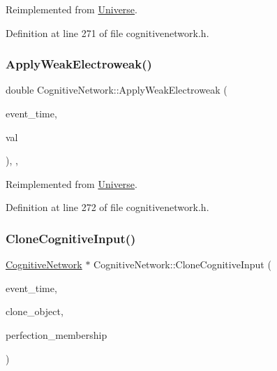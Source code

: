 Reimplemented from \hyperlink{class_universe_a6d1226b3adec3c42a833afdbb6a65a92}{Universe}.



Definition at line 271 of file cognitivenetwork.\+h.

\mbox{\label{class_cognitive_network_ab8bc213d2806f0dc49c1284bf934fc24}} 
\subsubsection{\texorpdfstring{Apply\+Weak\+Electroweak()}{ApplyWeakElectroweak()}}
{\footnotesize\ttfamily double Cognitive\+Network\+::\+Apply\+Weak\+Electroweak (\begin{DoxyParamCaption}\item[{std\+::chrono\+::time\+\_\+point$<$ \hyperlink{universe_8h_a0ef8d951d1ca5ab3cfaf7ab4c7a6fd80}{Clock} $>$}]{event\+\_\+time,  }\item[{double}]{val }\end{DoxyParamCaption})\hspace{0.3cm}{\ttfamily [inline]}, {\ttfamily [final]}, {\ttfamily [virtual]}}



Reimplemented from \hyperlink{class_universe_a46a906baabb63e5d31f8b48ea1fae52e}{Universe}.



Definition at line 272 of file cognitivenetwork.\+h.

\mbox{\label{class_cognitive_network_a058cb2b044d56268e36f153fac21084e}} 
\subsubsection{\texorpdfstring{Clone\+Cognitive\+Input()}{CloneCognitiveInput()}}
{\footnotesize\ttfamily \hyperlink{class_cognitive_network}{Cognitive\+Network} $\ast$ Cognitive\+Network\+::\+Clone\+Cognitive\+Input (\begin{DoxyParamCaption}\item[{std\+::chrono\+::time\+\_\+point$<$ \hyperlink{universe_8h_a0ef8d951d1ca5ab3cfaf7ab4c7a6fd80}{Clock} $>$}]{event\+\_\+time,  }\item[{\hyperlink{class_cognitive_network}{Cognitive\+Network} $\ast$}]{clone\+\_\+object,  }\item[{double}]{perfection\+\_\+membership }\end{DoxyParamCaption})}




